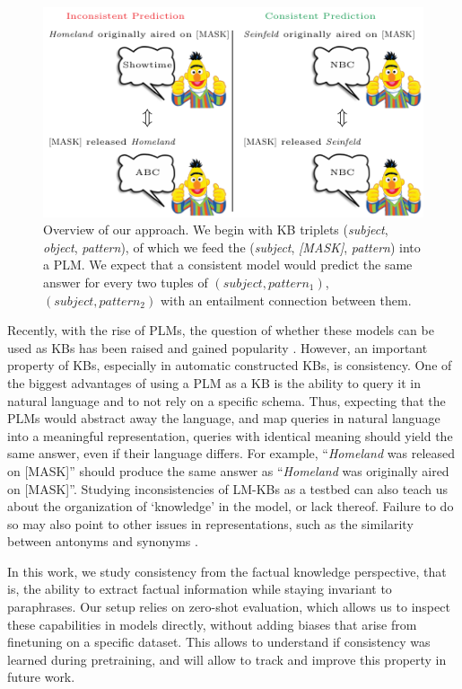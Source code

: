 \begin{figure}[t!]
\centering

\includegraphics[width=1.\columnwidth]{figures/overview}

\caption{Overview of our approach. We begin with KB triplets (\textit{subject}, \textit{object}, \textit{pattern}), of which we feed the (\textit{subject}, \textit{[MASK]}, \textit{pattern}) into a PLM. 
We expect that a consistent model would predict the same answer for every two tuples of $(subject, pattern_1)$, $(subject, pattern_2)$ with an entailment connection between them.}
\label{fig:overview}
\end{figure}


Recently, with the rise of PLMs, the question of whether these models can be used as KBs has been raised and gained popularity \cite{lama,petroni2020how,alpaqa}. However, an important property of KBs, especially in automatic constructed KBs, is consistency.
One of the biggest advantages of using a PLM as a KB is the ability to query it in natural language and to not rely on a specific schema.
Thus, expecting that the PLMs would abstract away the language, and map queries in natural language into a meaningful representation, queries with identical meaning should yield the same answer, even if their language differs.
For example, ``\textit{Homeland} was released on [MASK]'' should produce the same answer as ``\textit{Homeland} was originally aired on [MASK]''.
Studying inconsistencies of LM-KBs as a testbed can also teach us about the organization of `knowledge' in the model, or lack thereof. Failure to do so may also point to other issues in representations, such as the similarity between antonyms and synonyms \cite{nguyen2016integrating}.

In this work, we study consistency from the factual knowledge perspective, that is, the ability to extract factual information while staying invariant to paraphrases.
Our setup relies on zero-shot evaluation, which allows us to inspect these capabilities in models directly, without adding biases that arise from finetuning on a specific dataset. This allows to understand if consistency was learned during pretraining, and will allow to track and improve this property in future work. %



